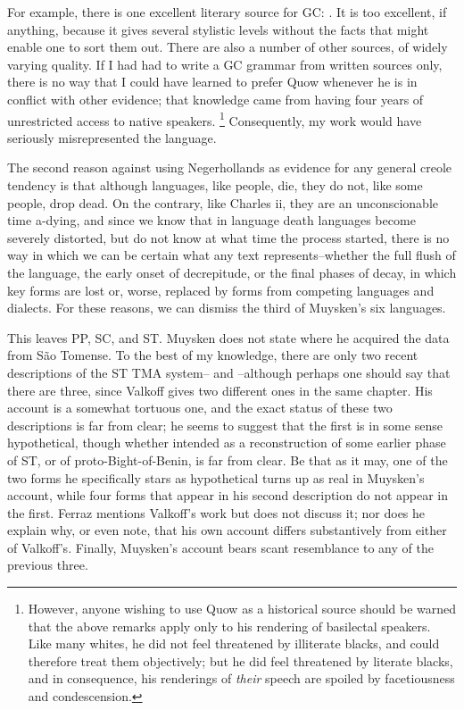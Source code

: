 For example, there is one excellent literary source for GC: \citet{Quow1877}. It is too excellent, if anything, because it gives several stylistic levels without the facts that might enable one to sort them out. There are also a number of other sources, of widely varying quality. If I had had to write a GC grammar from written sources only, there is no way that I could have learned to prefer Quow whenever he is in conflict with other evidence; that knowledge came from having four years of unrestricted access to native speakers.%
\footnote{However, anyone wishing to use Quow as a historical source should be warned that the above remarks apply only to his rendering of basilectal speakers. Like many whites, he did not feel threatened by illiterate blacks, and could therefore treat them objectively; but he did feel threatened by literate blacks, and in consequence, his ren\-derings of \textit{their} speech are spoiled by facetiousness and condescension.}
Consequently, my work would have seriously misrepresented the language.


The second reason against using Negerhollands as evidence for any general creole tendency is that although languages, like people, die, they do not, like some people, drop dead. On the contrary, like Charles {\sc ii}, they are an unconscionable time a-dying, and since we know that in language death languages become severely distorted, but do not know at what time the process started, there is no way in which we can be certain what any text represents--whether the full flush of the language, the early onset of decrepitude, or the final phases of decay, in which key forms are lost or, worse, replaced by forms from competing languages and dialects. For these reasons, we can dismiss the third of Muysken's six languages.

This leaves PP, SC, and ST. Muysken does not state where he acquired the data from S{\~a}o Tomense. To the best of my knowledge, there are only two recent descriptions of the ST TMA system--\citealt{Valkoff1966} and \citealt{Ferraz1979}--although perhaps one should say that there are three, since Valkoff gives two different ones in the same chapter. His account is a somewhat tortuous one, and the exact status of these two descriptions is far from clear; he seems to suggest that the first is in some sense hypothetical, though whether intended as a reconstruc\-tion of some earlier phase of ST, or of proto-Bight-of-Benin, is far from clear. Be that as it may, one of the two forms he specifically stars as hypothetical turns up as real in Muysken's account, while four forms that appear in his second description do not appear in the first. Ferraz mentions Valkoff's work but does not discuss it; nor does he explain why, or even note, that his own account differs substantively from either of Valkoff's. Finally, Muysken's account bears scant resemblance to any of the previous three.

